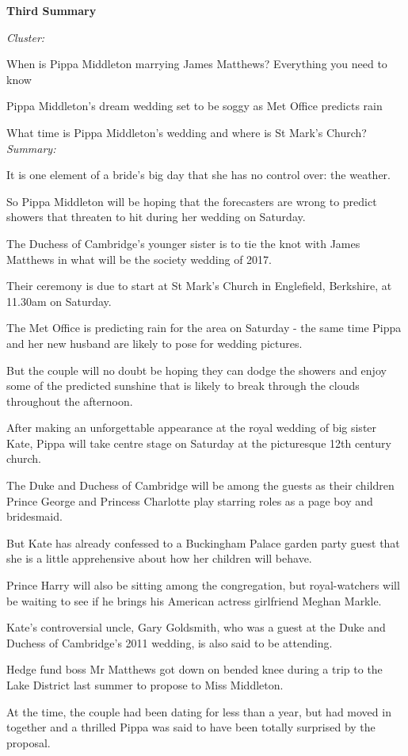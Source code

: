 \documentclass[12pt]{article}
\begin{document}
\textbf{Third Summary}

\begin{mdframed}

\emph{Cluster:}

When is Pippa Middleton marrying James Matthews? Everything you need to know \cite{pippa1}

Pippa Middleton's dream wedding set to be soggy as Met Office predicts rain \cite{pippa2}

What time is Pippa Middleton's wedding and where is St Mark's Church? \cite{pippa3} \\

\emph{Summary:}

It is one element of a bride's big day that she has no control over: the weather.

So Pippa Middleton will be hoping that the forecasters are wrong to predict showers that threaten to hit during her wedding on Saturday.

The Duchess of Cambridge's younger sister is to tie the knot with James Matthews in what will be the society wedding of 2017.

Their ceremony is due to start at St Mark's Church in Englefield, Berkshire, at 11.30am on Saturday.

The Met Office is predicting rain for the area on Saturday - the same time Pippa and her new husband are likely to pose for wedding pictures.

But the couple will no doubt be hoping they can dodge the showers and enjoy some of the predicted sunshine that is likely to break through the clouds throughout the afternoon.

After making an unforgettable appearance at the royal wedding of big sister Kate, Pippa will take centre stage on Saturday at the picturesque 12th century church.

The Duke and Duchess of Cambridge will be among the guests as their children Prince George and Princess Charlotte play starring roles as a page boy and bridesmaid.

But Kate has already confessed to a Buckingham Palace garden party guest that she is a little apprehensive about how her children will behave.

Prince Harry will also be sitting among the congregation, but royal-watchers will be waiting to see if he brings his American actress girlfriend Meghan Markle.

Kate's controversial uncle, Gary Goldsmith, who was a guest at the Duke and Duchess of Cambridge's 2011 wedding, is also said to be attending.

Hedge fund boss Mr Matthews got down on bended knee during a trip to the Lake District last summer to propose to Miss Middleton.

At the time, the couple had been dating for less than a year, but had moved in together and a thrilled Pippa was said to have been totally surprised by the proposal. \\

\end{mdframed}
\end{document}

